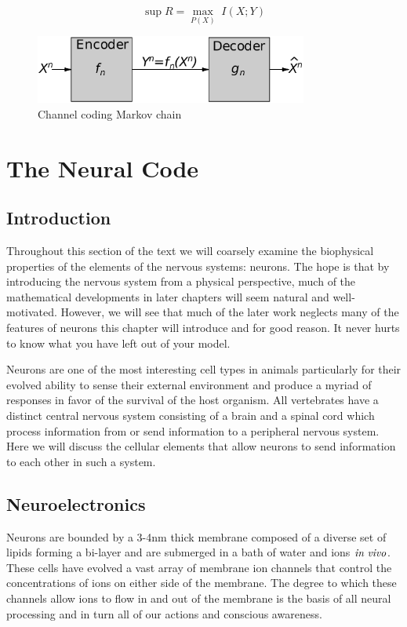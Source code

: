 \documentclass[a4paper,11pt]{book}
\begin{document}
\begin{equation*}
\sup R = \underset{P(X)}\max \;I(X;Y) 
\end{equation*}


\begin{figure}
\centering
  \includegraphics[width=0.8\textwidth]{assets/channel-coding.png}
  \caption{Channel coding Markov chain}
  \label{fig:circuit}
\end{figure}

\chapter{The Neural Code}

\section{Introduction}

Throughout this section of the text we will coarsely examine the biophysical properties of the elements of the nervous systems: neurons. The hope is that by introducing the nervous system from a physical perspective, much of the mathematical developments in later chapters will seem natural and well-motivated. However, we will see that much of the later work neglects many of the features of neurons this chapter will introduce and for good reason. It never hurts to know what you have left out of your model.

Neurons are one of the most interesting cell types in animals particularly for their evolved ability to sense their external environment and produce a myriad of responses in favor of the survival of the host organism. All vertebrates have a distinct central nervous system consisting of a brain and a spinal cord which process information from or send information to a peripheral nervous system. Here we will discuss the cellular elements that allow neurons to send information to each other in such a system.

\section{Neuroelectronics}

Neurons are bounded by a 3-4nm thick membrane composed of a diverse set of lipids forming a bi-layer and are submerged in a bath of water and ions $\it{in \;vivo}$. These cells have evolved a vast array of membrane ion channels that control the concentrations of ions on either side of the membrane. The degree to which these channels allow ions to flow in and out of the membrane is the basis of all neural processing and in turn all of our actions and conscious awareness. 
\end{document}
